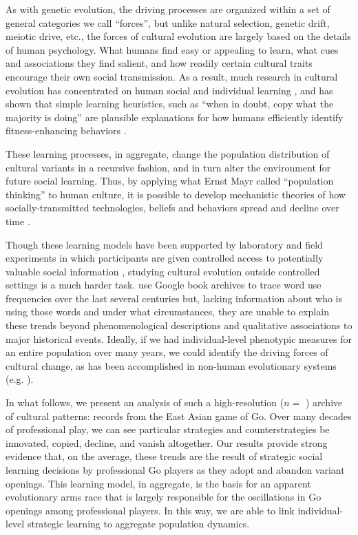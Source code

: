 \documentclass[12pt]{article}
\begin{document}
As with genetic evolution, the driving processes are organized within a set of general categories we call ``forces'', but unlike natural selection, genetic drift, meiotic drive, etc., the forces of cultural evolution are largely based on the details of human psychology. What humans find easy or appealing to learn, what cues and associations they find salient, and how readily certain cultural traits encourage their own social transmission. As a result, much research in cultural evolution has concentrated on human social and individual learning \citep{mesoudi2006unified}, and has shown that simple learning heuristics, such as ``when in doubt, copy what the majority is doing'' are plausible explanations for how humans efficiently identify fitness-enhancing behaviors \citep{mcelreath2008successbias}.

These learning processes, in aggregate, change the population distribution of cultural variants in a recursive fashion, and in turn alter the environment for future social learning. Thus, by applying what Ernst Mayr called ``population thinking'' to human culture, it is possible to develop mechanistic theories of how socially-transmitted technologies, beliefs and behaviors spread and decline over time \citep{shennan2009pattern}.

Though these learning models have been supported by laboratory and field experiments in which participants are given controlled access to potentially valuable social information \citep{baum2004cultural, caldwell2008studying, efferson2007equality, mesoudi2011payoffbias}, studying cultural evolution outside controlled settings is a much harder task. \citet{michel2011quantitative} use Google book archives to trace word use frequencies over the last several centuries but, lacking information about who is using those words and under what circumstances, they are unable to explain these trends beyond phenomenological descriptions and qualitative associations to major historical events. Ideally, if we had individual-level phenotypic measures for an entire population over many years, we could identify the driving forces of cultural change, as has been accomplished in non-human evolutionary systems (e.g. \citet{grant2002unpredictable, ozgul2009dynamics}).

In what follows, we present an analysis of such a high-resolution ($n=$ \nGames) archive of cultural patterns: records from the East Asian game of Go. Over many decades of professional play, we can see particular strategies and counterstrategies be innovated, copied, decline, and vanish altogether. Our results provide strong evidence that, on the average, these trends are the result of strategic social learning decisions by professional Go players as they adopt and abandon variant openings. This learning model, in aggregate, is the basis for an apparent evolutionary arms race that is largely responsible for the oscillations in Go openings among professional players. In this way, we are able to link individual-level strategic learning to aggregate population dynamics.
\end{document}
